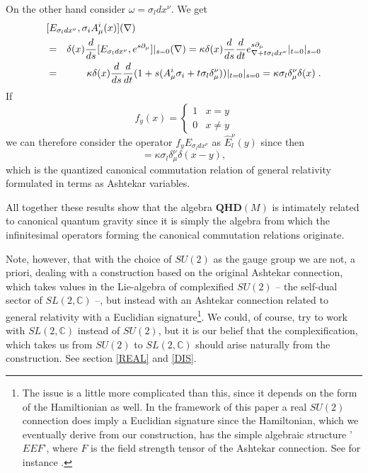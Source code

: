 \documentclass[12pt]{article}
\def\m{\mu}
\def\n{\nu}
\begin{document}
On the other hand consider $\omega =\sigma_ldx^\n$. We get 
\begin{eqnarray*}
\lefteqn{[E_{\sigma_ldx^\n},\sigma_i A^i_\m(x)] (\nabla )}\\
&=& \delta(x)  \frac{d}{ds} [E_{\sigma_ldx^\n},  e^{s\partial_\m}  ]|_{s=0}(\nabla)= \kappa \delta(x)  \frac{d}{ds} \frac{d}{dt} e^{s\partial_\m}_{\nabla+t\sigma_ldx^\n}|_{t=0}|_{s=0}\\
&=&  \kappa \delta(x)  \frac{d}{ds} \frac{d}{dt} (1+s(A_\m^i\sigma_i+t\sigma_l \delta_\m^\n  ))|_{t=0}|_{s=0}=\kappa \sigma_l \delta_\m^\n \delta(x) \;.
\end{eqnarray*}
If 
$$f_y(x)=\left\{ 
\begin{array}{cl}
1& x=y \\
0& x\not =y
\end{array}\right.$$
we can therefore consider the operator $f_y  E_{\sigma_ldx^\n}$ as $\hat{E}_l^\n (y)$ since then 
\begin{equation}
 [ \hat{E}_l^\n (y) , \sigma_i A^i_\m(x)] = \kappa \sigma_l \delta_\m^\n \delta (x-y),
\label{COOOM}
 \end{equation}
which is the quantized canonical commutation relation of general relativity formulated in terms as Ashtekar variables.

All together these results show that the algebra $\mathbf{QHD}(M)$ is intimately related to canonical quantum gravity since it is simply the algebra from which the infinitesimal operators forming the canonical commutation relations originate. 

Note, however, that with the choice of $SU(2)$ as the gauge group we are not, a priori, dealing with a construction based on the original Ashtekar connection, which takes values in the Lie-algebra of complexified $SU(2)$ -- the self-dual sector of $SL(2,\mathbb{C})$ --, but instead with an Ashtekar connection related to general relativity with a Euclidian signature\footnote{The issue is a little more complicated than this, since it depends on the form of the Hamiltionian as well. In the framework of this paper a real $SU(2)$ connection does imply a Euclidian signature since the Hamiltonian, which we eventually derive from our construction, has the simple algebraic structure '$EEF$', where $F$ is the field strength tensor of the Ashtekar connection. See for instance \cite{AL1}.}. We could, of course, try to work with $SL(2,\mathbb{C})$ instead of $SU(2)$, but it is our belief that the complexification, which takes us from $SU(2)$ to $SL(2,\mathbb{C})$ should arise naturally from the construction. See section \ref{REAL} and \ref{DIS}.
\end{document}

